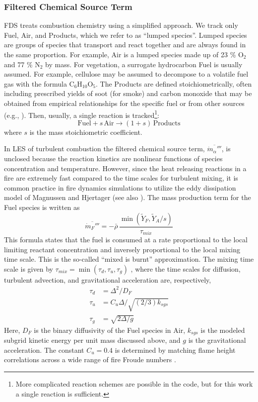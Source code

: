 \documentclass[journal,article,atmosphere,submit,moreauthors,pdftex]{Definitions/mdpi}
\renewcommand{\C}{\mathrm{C}}
\renewcommand{\H}{\mathrm{H}}
\renewcommand{\O}{\mathrm{O}}
\begin{document}
\subsubsection{Filtered Chemical Source Term}

FDS treats combustion chemistry using a simplified approach.  We track only Fuel, Air, and Products, which we refer to as ``lumped species''.  Lumped species are groups of species that transport and react together and are always found in the same proportion.  For example, Air is a lumped species made up of 23 \% O$_2$ and 77 \% N$_2$ by mass.  For vegetation, a surrogate hydrocarbon Fuel is usually assumed.  For example, cellulose may be assumed to decompose to a volatile fuel gas with the formula $\C_{6} \H_{10} \O_{5}$.  The Products are defined stoichiometrically, often including prescribed yields of soot (for smoke) and carbon monoxide that may be obtained from empirical relationships for the specific fuel or from other sources (e.g., \cite{SFPE:Mulholland}).  Then, usually, a single reaction is tracked\footnote{More complicated reaction schemes are possible in the code, but for this work a single reaction is sufficient.}:
\begin{equation}
\mathrm{Fuel} + s \, \mathrm{Air} \rightarrow (1+s) \,\mathrm{Products}
\end{equation}
where $s$ is the mass stoichiometric coefficient.  

In LES of turbulent combustion the filtered chemical source term, $\overline{\dot{m}_\alpha'''}$, is unclosed because the reaction kinetics are nonlinear functions of species concentration and temperature.  However, since the heat releasing reactions in a fire are extremely fast compared to the time scales for turbulent mixing, it is common practice in fire dynamics simulations to utilize the eddy dissipation model of Magnussen and Hjertager \cite{Magnussen:1} (see also \cite{Poinsot:TNC}).  The mass production term for the Fuel species is written as
\begin{equation}
\overline{\dot{m}_{F}'''} = -\bar{\rho} \,\frac{\min(\tilde{Y}_F,\tilde{Y}_A/s)}{\tau_{mix}}
\end{equation}
This formula states that the fuel is consumed at a rate proportional to the local limiting reactant concentration and inversely proportional to the local mixing time scale.  This is the so-called ``mixed is burnt'' approximation.  The mixing time scale is given by $\tau_{mix} = \min(\tau_d, \tau_u,\tau_g)$ \cite{McDermott:2011}, where the time scales for diffusion, turbulent advection, and gravitational acceleration are, respectively,
\begin{align}
\tau_d &= \Delta^2/D_F \\
\tau_u &= C_u \Delta / \sqrt{(2/3)k_{sgs}} \\
\tau_g &= \sqrt{2\Delta/g}
\end{align}
Here, $D_F$ is the binary diffusivity of the Fuel species in Air, $k_{sgs}$ is the modeled subgrid kinetic energy per unit mass discussed above, and $g$ is the gravitational acceleration. The constant $C_u=0.4$ is determined by matching flame height correlations across a wide range of fire Froude numbers \cite{FDS_Validation_Guide}.
\end{document}
